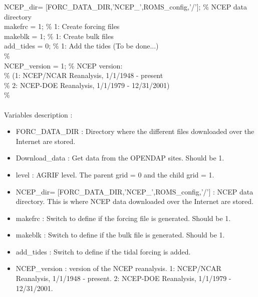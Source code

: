 NCEP\_dir= [FORC\_DATA\_DIR,'NCEP\_',ROMS\_config,'/']; \% NCEP data directory\\
makefrc      = 1;                            \% 1: Create forcing files\\
makeblk      = 1;                            \% 1: Create bulk files\\
add\_tides     = 0;                     \% 1: Add the tides (To be done...)\\
\%\\
NCEP\_version  = 1;                            \% NCEP version:\\
\%                                 (1: NCEP/NCAR Reanalysis, 1/1/1948 - present\\
\%                                  2: NCEP-DOE Reanalysis, 1/1/1979 - 12/31/2001)\\
\%\\
\\
Variables description :
\begin{itemize}
\item FORC\_DATA\_DIR : Directory where the different files downloaded over 
the Internet are stored.
\item Download\_data : Get data from the OPENDAP sites. Should be 1.
\item level : AGRIF level. The parent grid = 0 and the child grid = 1.
\item NCEP\_dir= [FORC\_DATA\_DIR,'NCEP\_',ROMS\_config,'/'] : NCEP data directory. 
This is where NCEP data downloaded over the Internet are stored.
\item makefrc : Switch to define if the forcing file is generated. Should be 1.
\item makeblk : Switch to define if the bulk file is generated. Should be 1.
\item add\_tides : Switch to define if the tidal forcing is added. 
\item NCEP\_version : version of the NCEP reanalysis. 1: NCEP/NCAR Reanalysis, 1/1/1948 - present.
2: NCEP-DOE Reanalysis, 1/1/1979 - 12/31/2001.
\end{itemize}


